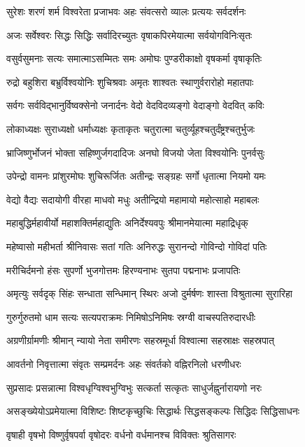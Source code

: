 \twolineshloka
{सुरेशः शरणं शर्म विश्वरेता प्रजाभवः}
{अहः संवत्सरो व्यालः प्रत्ययः सर्वदर्शनः}

\twolineshloka
{अजः सर्वेश्वरः सिद्धः सिद्धिः सर्वादिरच्युतः}
{वृषाकपिरमेयात्मा सर्वयोगविनिःसृतः}

\twolineshloka
{वसुर्वसुमनाः सत्यः समात्माऽसम्मितः समः}
{अमोघः पुण्डरीकाक्षो वृषकर्मा वृषाकृतिः}

\twolineshloka
{रुद्रो बहुशिरा बभ्रुर्विश्वयोनिः शुचिश्रवाः}
{अमृतः शाश्वतः स्थाणुर्वरारोहो महातपाः}

\twolineshloka
{सर्वगः सर्वविद्भानुर्विष्वक्सेनो जनार्दनः}
{वेदो वेदविदव्यङ्गो वेदाङ्गो वेदवित् कविः}

\twolineshloka
{लोकाध्यक्षः सुराध्यक्षो धर्माध्यक्षः कृताकृतः}
{चतुरात्मा चतुर्व्यूहश्चतुर्दंष्ट्रश्चतुर्भुजः}

\twolineshloka
{भ्राजिष्णुर्भोजनं भोक्ता सहिष्णुर्जगदादिजः}
{अनघो विजयो जेता विश्वयोनिः पुनर्वसुः}

\twolineshloka
{उपेन्द्रो वामनः प्रांशुरमोघः शुचिरूर्जितः}
{अतीन्द्रः सङ्ग्रहः सर्गो धृतात्मा नियमो यमः}

\twolineshloka
{वेद्यो वैद्यः सदायोगी वीरहा माधवो मधुः}
{अतीन्द्रियो महामायो महोत्साहो महाबलः}

\twolineshloka
{महाबुद्धिर्महावीर्यो महाशक्तिर्महाद्युतिः}
{अनिर्देश्यवपुः श्रीमानमेयात्मा महाद्रिधृक्}

\twolineshloka
{महेष्वासो महीभर्ता श्रीनिवासः सतां गतिः}
{अनिरुद्धः सुरानन्दो गोविन्दो गोविदां पतिः}

\twolineshloka
{मरीचिर्दमनो हंसः सुपर्णो भुजगोत्तमः}
{हिरण्यनाभः सुतपा पद्मनाभः प्रजापतिः}

\twolineshloka
{अमृत्युः सर्वदृक् सिंहः सन्धाता सन्धिमान् स्थिरः}
{अजो दुर्मर्षणः शास्ता विश्रुतात्मा सुरारिहा}

\twolineshloka
{गुरुर्गुरुतमो धाम सत्यः सत्यपराक्रमः}
{निमिषोऽनिमिषः स्रग्वी वाचस्पतिरुदारधीः}

\twolineshloka
{अग्रणीर्ग्रामणीः श्रीमान् न्यायो नेता समीरणः}
{सहस्रमूर्धा विश्वात्मा सहस्राक्षः सहस्रपात्}

\twolineshloka
{आवर्तनो निवृत्तात्मा संवृतः सम्प्रमर्दनः}
{अहः संवर्तको वह्निरनिलो धरणीधरः}

\twolineshloka
{सुप्रसादः प्रसन्नात्मा विश्वधृग्विश्वभुग्विभुः}
{सत्कर्ता सत्कृतः साधुर्जह्नुर्नारायणो नरः}

\twolineshloka
{असङ्ख्येयोऽप्रमेयात्मा विशिष्टः शिष्टकृच्छुचिः}
{सिद्धार्थः सिद्धसङ्कल्पः सिद्धिदः सिद्धिसाधनः}

\twolineshloka
{वृषाही वृषभो विष्णुर्वृषपर्वा वृषोदरः}
{वर्धनो वर्धमानश्च विविक्तः श्रुतिसागरः}


